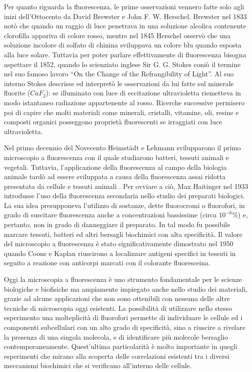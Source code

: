 Per quanto riguarda la fluorescenza, le prime osservazioni vennero fatte solo agli inizi dell'Ottocento da David Brewster e John F. W. Herschel. Brewster nel 1833 notò che quando un raggio di luce penetrava in una soluzione alcolica contenente clorofilla appariva di colore rosso, mentre nel 1845 Herschel osservò che una soluzione incolore di solfato di chinina sviluppava un colore blu quando esposta alla luce solare. 
Tuttavia per poter parlare effettivamente di fluorescenza bisogna aspettare il 1852, quando lo scienziato inglese Sir G. G. Stokes coniò il termine nel suo famoso lavoro ``On the Change of the Refrangibility of Light''. 
Al suo interno Stokes descrisse ed interpretò le osservazioni da lui fatte sul minerale fluorite ($CaF_2$): se illuminato con luce di eccitazione ultravioletta riemetteva in modo istantaneo radiazione appartenente al rosso. 
Ricerche successive permisero poi di capire che molti materiali come minerali, cristalli, vitamine, oli, resine e composti organici posseggono proprietà fluorescenti se irraggiati con luce ultravioletta. 

Nel primo decennio del Novecento Heimstädt e Lehmann svilupparono il primo microscopio a fluorescenza con il quale studiarono batteri, tessuti animali e vegetali.
Tuttavia, l'applicazione della fluorescenza al campo della biologia animale tardò ad essere sviluppata a causa della fluorescenza assai ridotta presentata da cellule e tessuti animali \cite{storia}.
Per ovviare a ciò, Max Haitinger nel 1933 introdusse l'uso della fluorescenza secondaria nello studio dei preparati biologici.
La sua idea presupponeva l'utilizzo di sostanze, dette fluorocromi o fluorofori, in grado di suscitare fluorescenza anche a concentrazioni bassissime (circa $10^{-6}$\%) e, pertanto, non in grado di danneggiare il preparato. 
In tal modo fu possibile marcare tessuti, batteri ed altri bersagli biochimici con alta specificità.
Il valore del microscopio a fluorescenza è stato significativamente dimostrato nel 1950 quando Coons e Kaplan riuscirono a localizzare antigeni specifici in tessuti in seguito a reazione con anticorpi marcati con il colorante fluoresceina.

Oggi la microscopia a fluorescenza è uno strumento fondamentale per le scienze biologiche e biofisiche ma ampiamente impiegato anche nello studio dei materiali, grazie ad alcune applicazioni che non sono ottenibili con nessuna delle altre tecniche di microscopia oggi esistenti. 
La possibilità di utilizzare nello stesso esperimento una molteplicità di fluorofori permette di individuare le cellule ed i componenti subcellulari con un alto grado di specificità, sino a riuscire a rivelare la presenza di una singola molecola, e di identificare più molecole bersaglio contemporaneamente.
Quest'ultima particolarità è molto importante in quegli esperimenti che mirano alla scoperta delle correlazioni esistenti tra i diversi meccanismi biochimici che si verificano all'interno delle cellule.


